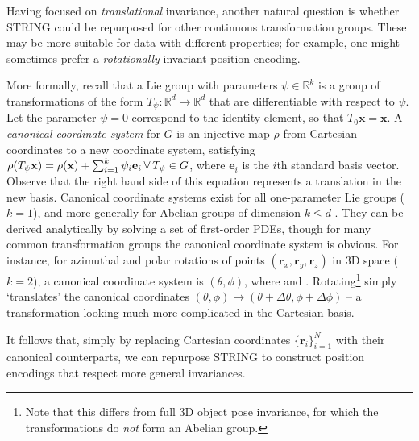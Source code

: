 Having focused on \emph{translational} invariance, another natural question is whether STRING could be repurposed for other continuous transformation groups.
These may be more suitable for data with different properties; for example, one might sometimes prefer a \emph{rotationally} invariant position encoding. %

More formally, recall that a Lie group with parameters $\psi \in \mathbb{R}^k$ is a group of transformations of the form $T_\psi: \mathbb{R}^d \to \mathbb{R}^d$ that are differentiable with respect to $\psi$.
Let the parameter $\psi=0$ correspond to the identity element, so that $T_0 \mathbf{x}=\mathbf{x}$.
A \emph{canonical coordinate system} for $G$ is an injective map $\rho$ from Cartesian coordinates to a new coordinate system, satisfying
$\rho(T_\psi \mathbf{x}) = \rho(\mathbf{x}) + \sum_{i=1}^k \psi_i \mathbf{e}_i \hspace{0.2em} \forall \hspace{0.2em} T_\psi \in G$,
where $\mathbf{e}_i$ is the $i$th standard basis vector.
Observe that the right hand side of this equation represents a translation in the new basis. 
Canonical coordinate systems exist for all one-parameter Lie groups ($k=1$), and more generally for Abelian groups of dimension $k \leq d$ \citep{segman1992canonical, rubinstein1991recognition, tai2019equivariant}. 
They can be derived analytically by solving a set of first-order PDEs, though for many common transformation groups the canonical coordinate system is obvious.
For instance, for azimuthal and polar rotations of points $(\boldsymbol{r}_x,\boldsymbol{r}_y, \boldsymbol{r}_z)$ in 3D space ($k=2$), a canonical coordinate system is $(\theta, \phi)$, where  and .
Rotating\footnote{Note that this differs from full 3D object pose invariance, for which the transformations do \emph{not} form an Abelian group.} simply `translates' the canonical coordinates $( \theta, \phi) \to (\theta + \Delta \theta, \phi + \Delta \phi)$ -- a transformation looking much more complicated in the Cartesian basis.


It follows that, simply by replacing Cartesian coordinates $\{\boldsymbol{r}_i\}_{i=1}^N$ with their canonical counterparts, we can repurpose STRING to construct position encodings that respect more general invariances.










